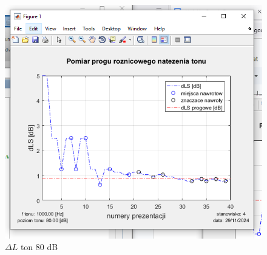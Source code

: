\documentclass[12pt]{article}
\begin{document}
\begin{figure}[H]
    \centering
    \includegraphics[width=\textwidth]{ton_80.png}
    \caption{$\Delta L$ ton 80 dB}
\end{figure}
\end{document}
